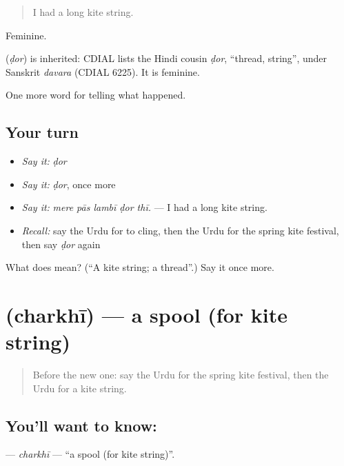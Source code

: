 \begin{quote}
I had a long kite string.
\end{quote}

Feminine.

\begin{cousinweb}
\textbf{} (\emph{ḍor}) is inherited: CDIAL lists the Hindi cousin \emph{ḍor}, \textquotedblleft{}thread, string\textquotedblright{}, under Sanskrit \emph{davara} (CDIAL 6225). It is feminine.
\end{cousinweb}

\begin{grammarlens}[title={What you've built}]
One more word for telling what happened.
\end{grammarlens}

\subsection*{Your turn}
\begin{itemize}
\raggedright
  \item \emph{Say it:} \emph{ḍor}
  \item \emph{Say it:} \emph{ḍor}, once more
  \item \emph{Say it:} \emph{mere pās lambī ḍor thī.} — I had a long kite string.
  \item \emph{Recall:} say the Urdu for to cling, then the Urdu for the spring kite festival, then say \emph{ḍor} again
\end{itemize}

\begin{tcolorbox}[breakable,colback=teal!4,colframe=teal!35!black,title={Before you move on}]
What does  mean? (\textquotedblleft{}A kite string; a thread\textquotedblright{}.) Say it once more.
\end{tcolorbox}
\section[\texorpdfstring{\ur{چرخی} (charkhī)}{چرخی (charkhī)}]{ (charkhī) — a spool (for kite string)}

\label{lesson:UR-C319-charkhi}



\begin{quote}
Before the new one: say the Urdu for the spring kite festival, then the Urdu for a kite string.
\end{quote}

\subsection*{You'll want to know: }
\textbf{} — \emph{charkhī} — \textquotedblleft{}a spool (for kite string)\textquotedblright{}.

